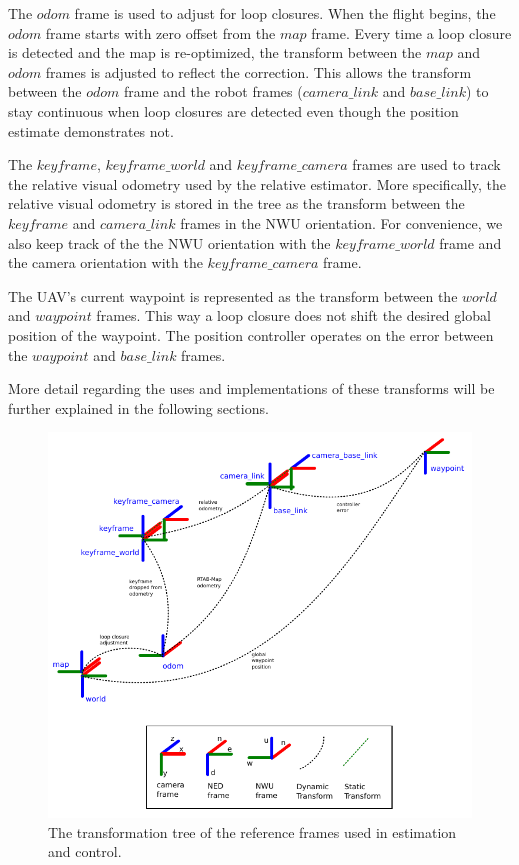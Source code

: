 \documentclass[letterpaper, 10 pt, conference]{ieeeconf}  %
\begin{document}
The $\mathit{odom}$ frame is used to adjust for loop closures. When the flight begins, the $\mathit{odom}$ frame starts with zero offset from the $\mathit{map}$ frame. Every time a loop closure is detected and the map is re-optimized, the transform between the $\mathit{map}$ and $\mathit{odom}$ frames is adjusted to reflect the correction. This allows the transform between the $\mathit{odom}$ frame and the robot frames ($\mathit{camera\_link}$ and $\mathit{base\_link}$) to stay continuous when loop closures are detected even though the position estimate demonstrates not.

The $\mathit{keyframe}$, $\mathit{keyframe\_world}$ and $\mathit{keyframe\_camera}$ frames are used to track the relative visual odometry used by the relative estimator. More specifically, the relative visual odometry is stored in the tree as the transform between the $\mathit{keyframe}$ and $\mathit{camera\_link}$ frames in the NWU orientation. For convenience, we also keep track of the the NWU orientation with the $\mathit{keyframe\_world}$ frame and the camera orientation with the $\mathit{keyframe\_camera}$ frame.

The UAV's current waypoint is represented as the transform between the $\mathit{world}$ and $\mathit{waypoint}$ frames. This way a loop closure does not shift the desired global position of the waypoint. The position controller operates on the error between the $\mathit{waypoint}$ and $\mathit{base\_link}$ frames.

More detail regarding the uses and implementations of these transforms will be further explained in the following sections.


\begin{figure}
\centering
\includegraphics[width=0.9\linewidth]{tf_tree_relative_rtab}
\caption{The transformation tree of the reference frames used in estimation and control.}
\label{fig:tf_tree}
\end{figure}
\end{document}
